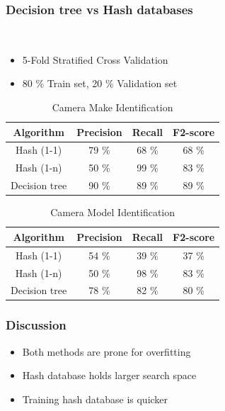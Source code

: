 \documentclass[10pt]{beamer}
\begin{document}
\begin{frame}
\frametitle{Decision tree vs Hash databases}
~\\\begin{itemize}
\item 5-Fold Stratified Cross Validation
\item 80 \% Train set, 20 \% Validation set
\end{itemize}

\begin{table}
\begin{small}
\begin{tabular}{| c| c| c| c|}
\hline
Algorithm & Precision & Recall & F2-score\\
\hline
Hash (1-1) & 79 \% & 68 \% & 68 \%\\
Hash (1-n) & 50 \% & 99 \% & 83 \%\\
Decision tree & 90 \% & 89 \% & 89 \% \\
\hline
\end{tabular}
\caption{Camera Make Identification}
\end{small}
\end{table}
\begin{table}
\begin{small}

\begin{tabular}{| c| c| c| c|}
\hline
Algorithm & Precision & Recall & F2-score\\
\hline
Hash (1-1) & 54 \% & 39 \% & 37 \%\\
Hash (1-n) & 50 \% & 98 \% & 83 \%\\
Decision tree & 78 \% & 82 \% & 80 \% \\
\hline
\end{tabular}
\caption{Camera Model Identification}
\end{small}

\end{table}
\end{frame}



\begin{frame}
\frametitle{Discussion}
\begin{itemize}
\item Both methods are prone for overfitting
\item Hash database holds larger search space
\item Training hash database is quicker
\end{itemize}
\end{frame}
\end{document}
